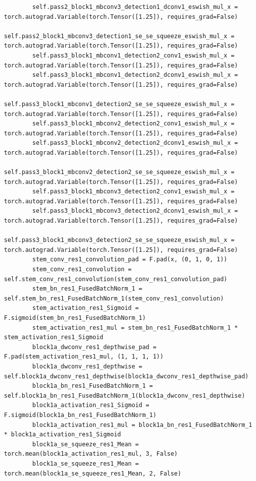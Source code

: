 \documentclass{fisatprojectfinal}
\begin{document}
\begin{appendices}
\begin{lstlisting}
        self.pass2_block1_mbconv3_detection1_dconv1_eswish_mul_x = torch.autograd.Variable(torch.Tensor([1.25]), requires_grad=False)
        self.pass2_block1_mbconv3_detection1_se_se_squeeze_eswish_mul_x = torch.autograd.Variable(torch.Tensor([1.25]), requires_grad=False)
        self.pass3_block1_mbconv1_detection2_conv1_eswish_mul_x = torch.autograd.Variable(torch.Tensor([1.25]), requires_grad=False)
        self.pass3_block1_mbconv1_detection2_dconv1_eswish_mul_x = torch.autograd.Variable(torch.Tensor([1.25]), requires_grad=False)
        self.pass3_block1_mbconv1_detection2_se_se_squeeze_eswish_mul_x = torch.autograd.Variable(torch.Tensor([1.25]), requires_grad=False)
        self.pass3_block1_mbconv2_detection2_conv1_eswish_mul_x = torch.autograd.Variable(torch.Tensor([1.25]), requires_grad=False)
        self.pass3_block1_mbconv2_detection2_dconv1_eswish_mul_x = torch.autograd.Variable(torch.Tensor([1.25]), requires_grad=False)
        self.pass3_block1_mbconv2_detection2_se_se_squeeze_eswish_mul_x = torch.autograd.Variable(torch.Tensor([1.25]), requires_grad=False)
        self.pass3_block1_mbconv3_detection2_conv1_eswish_mul_x = torch.autograd.Variable(torch.Tensor([1.25]), requires_grad=False)
        self.pass3_block1_mbconv3_detection2_dconv1_eswish_mul_x = torch.autograd.Variable(torch.Tensor([1.25]), requires_grad=False)
        self.pass3_block1_mbconv3_detection2_se_se_squeeze_eswish_mul_x = torch.autograd.Variable(torch.Tensor([1.25]), requires_grad=False)
        stem_conv_res1_convolution_pad = F.pad(x, (0, 1, 0, 1))
        stem_conv_res1_convolution = self.stem_conv_res1_convolution(stem_conv_res1_convolution_pad)
        stem_bn_res1_FusedBatchNorm_1 = self.stem_bn_res1_FusedBatchNorm_1(stem_conv_res1_convolution)
        stem_activation_res1_Sigmoid = F.sigmoid(stem_bn_res1_FusedBatchNorm_1)
        stem_activation_res1_mul = stem_bn_res1_FusedBatchNorm_1 * stem_activation_res1_Sigmoid
        block1a_dwconv_res1_depthwise_pad = F.pad(stem_activation_res1_mul, (1, 1, 1, 1))
        block1a_dwconv_res1_depthwise = self.block1a_dwconv_res1_depthwise(block1a_dwconv_res1_depthwise_pad)
        block1a_bn_res1_FusedBatchNorm_1 = self.block1a_bn_res1_FusedBatchNorm_1(block1a_dwconv_res1_depthwise)
        block1a_activation_res1_Sigmoid = F.sigmoid(block1a_bn_res1_FusedBatchNorm_1)
        block1a_activation_res1_mul = block1a_bn_res1_FusedBatchNorm_1 * block1a_activation_res1_Sigmoid
        block1a_se_squeeze_res1_Mean = torch.mean(block1a_activation_res1_mul, 3, False)
        block1a_se_squeeze_res1_Mean = torch.mean(block1a_se_squeeze_res1_Mean, 2, False)

\end{lstlisting}
\end{appendices}
\end{document}
